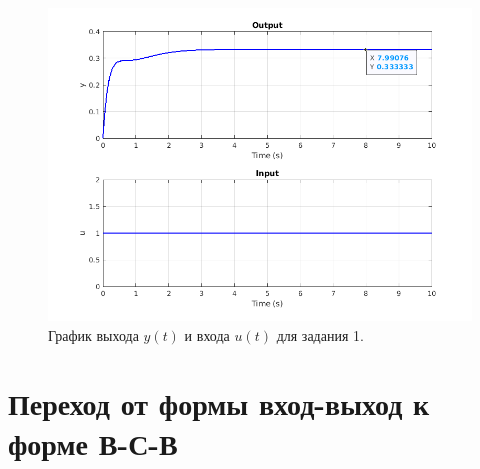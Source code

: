 \begin{figure}[htbp]
    \centering
    \includegraphics[width=0.9\linewidth]{figs/task_1_out.png}
    \caption{График выхода $y(t)$ и входа $u(t)$ для задания 1.}
    \label{fig:task_1_y}
\end{figure}




\section{Переход от формы вход-выход к форме В-С-В}


